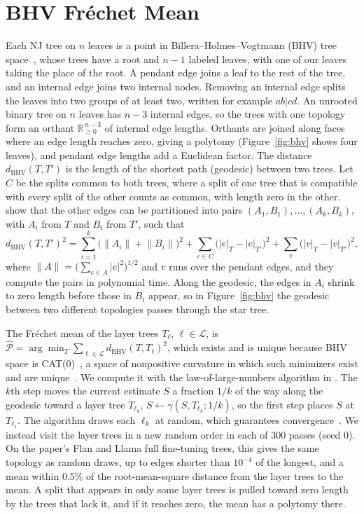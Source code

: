 \documentclass{article}
\theoremstyle{definition}
\theoremstyle{plain}
\newif\ifrevision
\newcommand{\rev}[1]{\ifrevision{\color{blue}#1}\else#1\fi}
\newcommand{\revcolor}{\ifrevision\color{blue}\fi}
\newcommand{\revtag}[1]{\ifrevision\textsuperscript{\color{blue}\sffamily\scriptsize[#1]}\fi}
\begin{document}
\section{\rev{BHV Fr\'echet Mean}}
\label{app:bhv}
{\revcolor
\revtag{FgwB W1}Each NJ tree on $n$ leaves is a point in Billera--Holmes--Vogtmann (BHV) tree space~\citep[Sec.~2]{billera2001geometry}, whose trees have a root and $n-1$ labeled leaves, with one of our leaves taking the place of the root. A pendant edge joins a leaf to the rest of the tree, and an internal edge joins two internal nodes. Removing an internal edge splits the leaves into two groups of at least two, written for example $ab|cd$. An unrooted binary tree on $n$ leaves has $n-3$ internal edges, so the trees with one topology form an orthant $\mathbb{R}_{\ge0}^{\,n-3}$ of internal edge lengths. Orthants are joined along faces where an edge length reaches zero, giving a polytomy (Figure~\ref{fig:bhv} shows four leaves), and pendant edge lengths add a Euclidean factor. The distance $d_{\mathrm{BHV}}(T,T')$ is the length of the shortest path (geodesic) between two trees. Let $C$ be the splits common to both trees, where a split of one tree that is compatible with every split of the other counts as common, with length zero in the other. \citet[Thm.~2.4 and Sec.~4]{owen2011fast} show that the other edges can be partitioned into pairs $(A_1,B_1),\dots,(A_k,B_k)$, with $A_i$ from $T$ and $B_i$ from $T'$, such that
\[
d_{\mathrm{BHV}}(T,T')^2=\sum_{i=1}^{k}\bigl(\lVert A_i\rVert+\lVert B_i\rVert\bigr)^2+\sum_{e\in C}\bigl(|e|_T-|e|_{T'}\bigr)^2+\sum_{v}\bigl(|v|_T-|v|_{T'}\bigr)^2 ,
\]
where $\lVert A\rVert=\bigl(\sum_{e\in A}|e|^2\bigr)^{1/2}$ and $v$ runs over the pendant edges, and they compute the pairs in polynomial time. Along the geodesic, the edges in $A_i$ shrink to zero length before those in $B_i$ appear, so in Figure~\ref{fig:bhv} the geodesic between two different topologies passes through the star tree.

The Fr\'echet mean of the layer trees $T_\ell$, $\ell\in\mathcal{L}$, is $\widehat{\mathcal{P}}=\arg\min_{T}\sum_{\ell\in\mathcal{L}}d_{\mathrm{BHV}}(T,T_\ell)^2$, which exists and is unique because BHV space is CAT(0)~\citep[Lemma~4.1]{billera2001geometry}, a space of nonpositive curvature in which such minimizers exist and are unique~\citep[Thm.~2.4]{bacak2014computing}. We compute it with the law-of-large-numbers algorithm in \citet[Sec.~5]{bacak2014computing}. The $k$th step moves the current estimate $S$ a fraction $1/k$ of the way along the geodesic toward a layer tree $T_{\ell_k}$, $S\leftarrow\gamma(S,T_{\ell_k};1/k)$, so the first step places $S$ at $T_{\ell_1}$. The algorithm draws each $\ell_k$ at random, which guarantees convergence~\citep[Thm.~5.1]{bacak2014computing}. We instead visit the layer trees in a new random order in each of 300 passes (seed 0). On the paper's Flan and Llama full fine-tuning trees, this gives the same topology as random draws, up to edges shorter than $10^{-4}$ of the longest, and a mean within 0.5\% of the root-mean-square distance from the layer trees to the mean. A split that appears in only some layer trees is pulled toward zero length by the trees that lack it, and if it reaches zero, the mean has a polytomy there.
}
\end{document}
